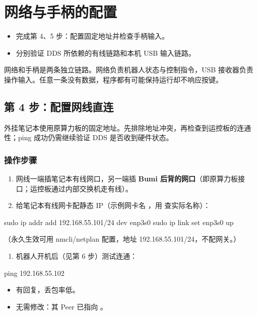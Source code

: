 \chapter{网络与手柄的配置}
\begin{intro}
\begin{itemize}
\item 完成第 4、5 步：配置固定地址并检查手柄输入。
\item 分别验证 DDS 所依赖的有线链路和本机 USB 输入链路。
\end{itemize}
\end{intro}
网络和手柄是两条独立链路。网络负责机器人状态与控制指令，USB 接收器负责操作输入。任意一条没有数据，程序都有可能保持运行却不响应按键。

\section{第 4 步：配置网线直连}
\label{step:4}
外挂笔记本使用原算力板的固定地址。先排除地址冲突，再检查到运控板的连通性；ping 成功仍需继续验证 DDS 是否收到硬件状态。


\subsection*{操作步骤}
\begin{enumerate}
\item 网线一端插笔记本有线网口，另一端插 \textbf{Bumi 后背的网口}（即原算力板接口；运控板通过内部交换机走有线）。
\item 给笔记本有线网卡配静态 IP（示例网卡名 ，用  查实际名称）：

\end{enumerate}
\begin{command}
sudo ip addr add 192.168.55.101/24 dev enp3s0
sudo ip link set enp3s0 up
\end{command}

（永久生效可用 nmcli/netplan 配置，地址 192.168.55.101/24，不配网关。）
\begin{enumerate}[resume]
\item 机器人开机后（见第 6 步）测试连通：

\end{enumerate}
\begin{command}
ping 192.168.55.102
\end{command}

\begin{expected}
\begin{itemize}
\item {} 有回复，丢包率低。
\item {} 无需修改：其 Peer 已指向 。

\end{itemize}
\end{expected}

